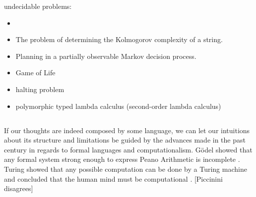 undecidable problems:
\begin{itemize}
    \item {}
    \item The problem of determining the Kolmogorov complexity of a string.
    \item Planning in a partially observable Markov decision process.
    \item Game of Life
    \item halting problem
    \item polymorphic typed lambda calculus (second-order lambda calculus)
\end{itemize}




\subsection{}
If our thoughts are indeed composed by some language, we can let our intuitions about its structure and limitations be guided by the advances made in the past century in regards to formal languages and computationalism.
Gödel showed that any formal system strong enough to express Peano Arithmetic is incomplete \cite{sep-goedel-incompleteness}. Turing showed that any possible computation can be done by a Turing machine and concluded that the human mind must be computational \cite{JCopeland2004-JCOTET}. [Piccinini disagrees]


